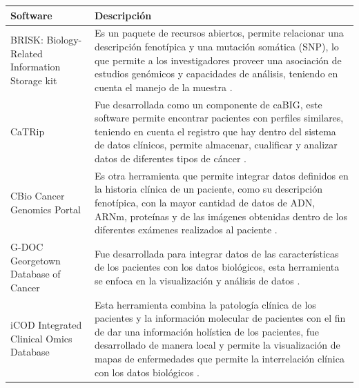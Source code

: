 \begin{table}[h!]
	\centering
	\begin{tabular}{|p{5cm}|p{10cm}|}
		\hline
		Software     & Descripción                                                                                                                                                                                                                                                                                                                                                                                 \\ \hline
		BRISK: Biology-Related Information Storage kit      & Es un paquete de recursos abiertos, permite relacionar una descripción fenotípica y una mutación somática (SNP), lo que permite a los investigadores proveer una asociación de estudios genómicos y capacidades de análisis, teniendo en cuenta el manejo de la muestra \cite{Triplet2014}.     \\ \cline{1-2}
		CaTRip       & Fue desarrollada como un componente de caBIG, este software permite encontrar pacientes con perfiles similares, teniendo en cuenta el registro que hay dentro del sistema de datos clínicos, permite almacenar, cualificar y analizar datos de diferentes tipos de cáncer \cite{Canuel2015}.       \\ \cline{1-2}
		CBio Cancer Genomics Portal & Es otra herramienta que permite integrar datos definidos en la historia clínica de un paciente, como su descripción fenotípica, con la mayor cantidad de datos de ADN, ARNm, proteínas y de las imágenes obtenidas dentro de los diferentes exámenes realizados al paciente  \cite{Canuel2015}.                                                                                                                                                                                                              \\ \hline
		G-DOC Georgetown Database of Cancer & Fue desarrollada para integrar datos de las características de los pacientes con los datos biológicos, esta herramienta se enfoca en la visualización y análisis de datos \cite{Canuel2015}.                                                                                                  \\ \cline{1-2}
		iCOD Integrated Clinical Omics Database     & Esta herramienta combina la patología clínica de los pacientes y la información molecular de pacientes con el fin de dar una información holística de los pacientes, fue desarrollado de manera local y permite la visualización de mapas de enfermedades que permite la interrelación clínica con los datos biológicos \cite{Canuel2015}.      \\ \hline
		

\end{tabular}
\end{table}
